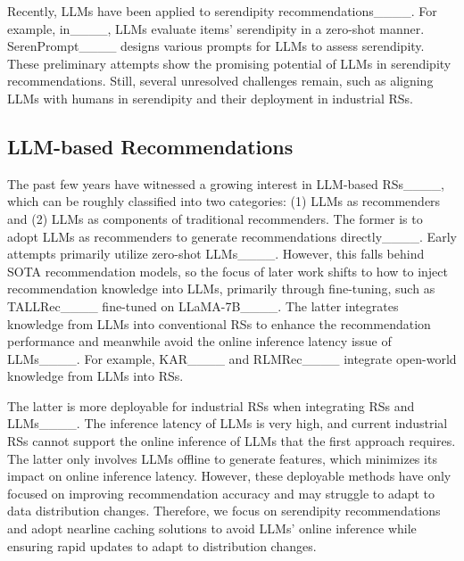 Recently, LLMs have been applied to serendipity recommendations____. For example, in____, LLMs evaluate items' serendipity in a zero-shot manner. SerenPrompt____ designs various prompts for LLMs to assess serendipity. These preliminary attempts show the promising potential of LLMs in serendipity recommendations. Still, several unresolved challenges remain, such as aligning LLMs with humans in serendipity and their deployment in industrial RSs.


\subsection{LLM-based Recommendations}
The past few years have witnessed a growing interest in LLM-based RSs____, which can be roughly classified into two categories: (1) LLMs as recommenders and (2) LLMs as components of traditional recommenders. The former is to adopt LLMs as recommenders to generate recommendations directly____. Early attempts primarily utilize zero-shot LLMs____. 
However, this falls behind SOTA recommendation models, so the focus of later work shifts to how to inject recommendation knowledge into LLMs, primarily through fine-tuning, such as TALLRec____ fine-tuned on LLaMA-7B____. 
The latter integrates knowledge from LLMs into conventional RSs to enhance the recommendation performance and meanwhile avoid the online inference latency issue of LLMs____. For example, KAR____ and RLMRec____ integrate open-world knowledge from LLMs into RSs. 


The latter is more deployable for industrial RSs when integrating RSs and LLMs____. The inference latency of LLMs is very high, and current industrial RSs cannot support the online inference of LLMs that the first approach requires. The latter only involves LLMs offline to generate features, which minimizes its impact on online inference latency. However, these deployable methods have only focused on improving recommendation accuracy and may struggle to adapt to data distribution changes. Therefore, we focus on serendipity recommendations and adopt nearline caching solutions to avoid LLMs' online inference while ensuring rapid updates to adapt to distribution changes.
